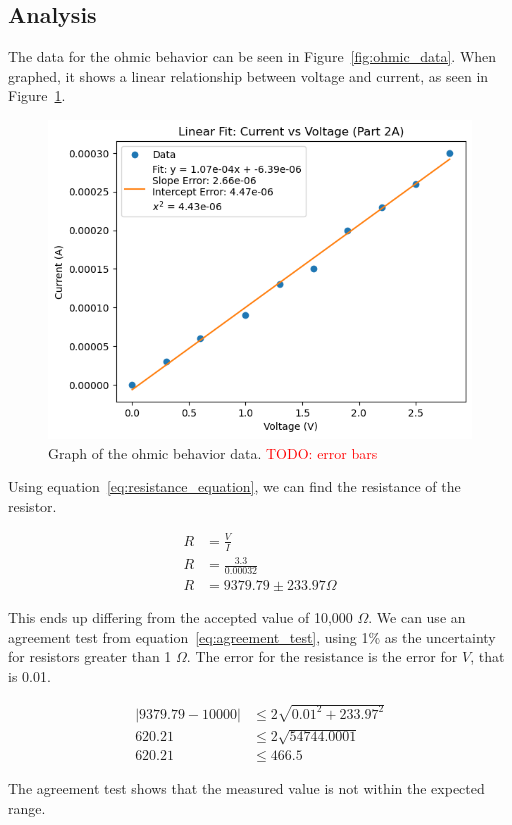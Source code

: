 \documentclass[11pt]{article}
\newcommand{\todo}[1]{\textcolor{red}{TODO: #1}\PackageWarning{TODO:}{#1!}}
\begin{document}
    \subsection{Analysis}\label{subsec:ohmic_analysis}

    The data for the ohmic behavior can be seen in Figure~\ref{fig:ohmic_data}.
    When graphed, it shows a linear relationship between voltage and current, as seen in Figure~\ref{fig:ohmic_graph}.
    \begin{figure}[h!]
        \centering
        \includegraphics[width=1.0\linewidth]{resources/images/part2a_ohmic_graph}
        \caption{Graph of the ohmic behavior data. \todo{error bars}} %
        \label{fig:ohmic_graph}
    \end{figure}

    Using equation~\ref{eq:resistance_equation}, we can find the resistance of the resistor.
    \begin{e}
        \begin{align*}
            R &= \frac{V}{I} \\
            R &= \frac{3.3}{0.00032} \\
            R &= 9379.79 \pm 233.97 \Omega
        \end{align*}
    \end{e}
    This ends up differing from the accepted value of 10,000 $\Omega$.
    We can use an agreement test from equation~\ref{eq:agreement_test}, using 1\% as the uncertainty for resistors
    greater than 1 $\Omega$.
    The error for the resistance is the error for $V$, that is 0.01.
    \begin{e}
        \begin{align*}
            |9379.79 - 10000| &\le 2 \sqrt{0.01^2 + 233.97^2} \\
            620.21 &\le 2 \sqrt{54744.0001} \\
            620.21 &\le 466.5
        \end{align*}
    \end{e}
    The agreement test shows that the measured value is not within the expected range.
\end{document}
